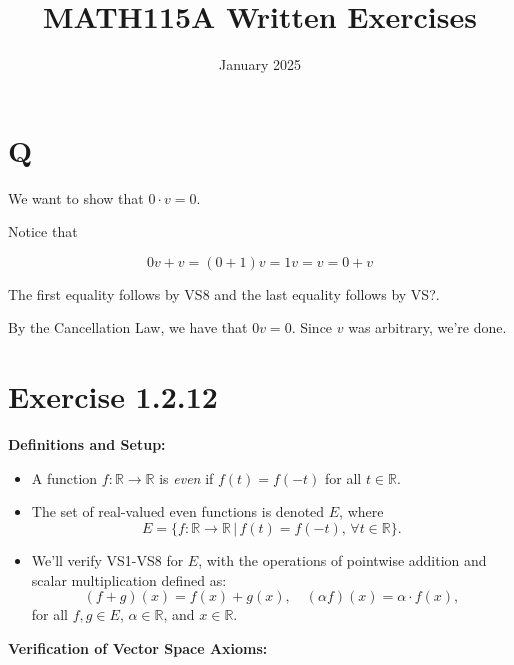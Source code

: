 \documentclass{article}
\title{MATH115A Written Exercises}
\date{January 2025}
\theoremstyle{definition}
\newcommand{\R}{\mathbb{R}}
\begin{document}
\maketitle

\section{Q}

We want to show that $ 0 \cdot v = 0 $.

Notice that 

\[ 0v + v = (0 + 1)v = 1v = v = 0 + v \]

The first equality follows by VS8 and the last equality
follows by VS?.

By the Cancellation Law, we have that $ 0v = 0 $.
Since $ v $ was arbitrary, we're done.

\newpage


\section*{Exercise 1.2.12}

\textbf{Definitions and Setup:}
\begin{itemize}
    \item A function \( f : \mathbb{R} \xrightarrow{} \mathbb{\R} \) is \textit{even} if \( f(t) = f(-t) \) for all \( t \in \R \).
    \item The set of real-valued even functions is denoted \( E \), where
    \[
    E = \{ f : \mathbb{R} \to \mathbb{R} \, | \, f(t) = f(-t), \, \forall t \in \mathbb{R} \}.
    \]
    \item We'll verify VS1-VS8 for \( E \), with the operations of pointwise addition and scalar multiplication defined as:
    \[
    (f + g)(x) = f(x) + g(x), \quad (\alpha f)(x) = \alpha \cdot f(x),
    \]
    for all \( f, g \in E \), \( \alpha \in \mathbb{R} \), and \( x \in \mathbb{R} \).
\end{itemize}

\textbf{Verification of Vector Space Axioms:}
\end{document}
